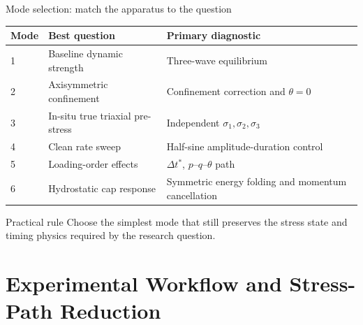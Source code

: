 \documentclass[11pt,aspectratio=169]{beamer}
\newcommand{\toprule}{\hline}
\newcommand{\midrule}{\hline}
\newcommand{\bottomrule}{\hline}
\begin{document}
\begin{frame}{Mode selection: match the apparatus to the question}
  \small
  \begin{tabular}{@{}p{}p{}p{}@{}}
    \toprule
    \textbf{Mode} & \textbf{Best question} & \textbf{Primary diagnostic} \\
    \midrule
    1 & Baseline dynamic strength & Three-wave equilibrium \\
    2 & Axisymmetric confinement & Confinement correction and $\theta=0$ \\
    3 & In-situ true triaxial pre-stress & Independent $\sigma_1,\sigma_2,\sigma_3$ \\
    4 & Clean rate sweep & Half-sine amplitude-duration control \\
    5 & Loading-order effects & $\Delta t^\ast$, $p$--$q$--$\theta$ path \\
    6 & Hydrostatic cap response & Symmetric energy folding and momentum cancellation \\
    \bottomrule
  \end{tabular}
  \vspace{0.35cm}
  \begin{block}{Practical rule}
    Choose the simplest mode that still preserves the stress state and timing
    physics required by the research question.
  \end{block}
\end{frame}

\section{Experimental Workflow and Stress-Path Reduction}
\end{document}
